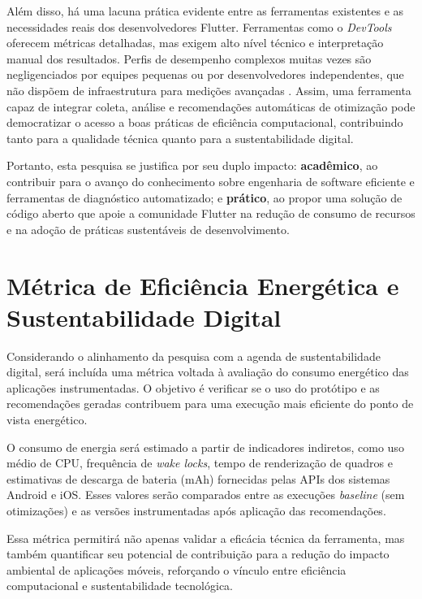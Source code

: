 \documentclass[12pt,a4paper,oneside]{abntex2}
\begin{document}
Além disso, há uma lacuna prática evidente entre as ferramentas existentes e as necessidades reais dos desenvolvedores Flutter. Ferramentas como o \textit{DevTools} oferecem métricas detalhadas, mas exigem alto nível técnico e interpretação manual dos resultados. Perfis de desempenho complexos muitas vezes são negligenciados por equipes pequenas ou por desenvolvedores independentes, que não dispõem de infraestrutura para medições avançadas \cite{johnson2020monitoring}. Assim, uma ferramenta capaz de integrar coleta, análise e recomendações automáticas de otimização pode democratizar o acesso a boas práticas de eficiência computacional, contribuindo tanto para a qualidade técnica quanto para a sustentabilidade digital.

Portanto, esta pesquisa se justifica por seu duplo impacto: \textbf{acadêmico}, ao contribuir para o avanço do conhecimento sobre engenharia de software eficiente e ferramentas de diagnóstico automatizado; e \textbf{prático}, ao propor uma solução de código aberto que apoie a comunidade Flutter na redução de consumo de recursos e na adoção de práticas sustentáveis de desenvolvimento.


\section{Métrica de Eficiência Energética e Sustentabilidade Digital}

Considerando o alinhamento da pesquisa com a agenda de sustentabilidade digital, será incluída uma métrica voltada à avaliação do consumo energético das aplicações instrumentadas. O objetivo é verificar se o uso do protótipo e as recomendações geradas contribuem para uma execução mais eficiente do ponto de vista energético.

O consumo de energia será estimado a partir de indicadores indiretos, como uso médio de CPU, frequência de \textit{wake locks}, tempo de renderização de quadros e estimativas de descarga de bateria (mAh) fornecidas pelas APIs dos sistemas Android e iOS. Esses valores serão comparados entre as execuções \textit{baseline} (sem otimizações) e as versões instrumentadas após aplicação das recomendações.

Essa métrica permitirá não apenas validar a eficácia técnica da ferramenta, mas também quantificar seu potencial de contribuição para a redução do impacto ambiental de aplicações móveis, reforçando o vínculo entre eficiência computacional e sustentabilidade tecnológica.
\end{document}
